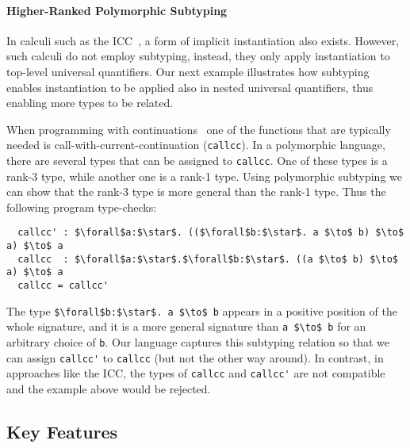 \paragraph{Higher-Ranked Polymorphic Subtyping}
\label{sec:higher-ranked-poly}

In calculi such as the ICC~\citep{miquel2001implicit}, a form of implicit instantiation also exists.
However, such calculi do not employ subtyping, instead, they only apply instantiation
to top-level universal quantifiers. Our next example illustrates how subtyping enables
instantiation to be applied also in nested universal quantifiers, thus enabling
more types to be related.

When programming with continuations~\citep{sussman1998scheme} one of the
functions that are typically needed is call-with-current-continuation
(\verb|callcc|). In a polymorphic language, there are several types that can be
assigned to \verb|callcc|. One of these types is a rank-3 type,
while another one is a rank-1 type.
Using polymorphic subtyping we can show that the rank-3
type is more general than the rank-1 type. Thus the following program type-checks:
\begin{lstlisting}
  callcc' : $\forall$a:$\star$. (($\forall$b:$\star$. a $\to$ b) $\to$ a) $\to$ a
  callcc  : $\forall$a:$\star$.$\forall$b:$\star$. ((a $\to$ b) $\to$ a) $\to$ a
  callcc = callcc'
\end{lstlisting}
\noindent The type \lstinline{$\forall$b:$\star$. a $\to$ b} appears in a positive position
of the whole signature, and it is a more general signature than \lstinline{a $\to$ b}
for an arbitrary choice of \lstinline{b}. Our language captures this subtyping relation so that
we can assign \lstinline{callcc'} to \lstinline{callcc} (but not the other way around).
In contrast, in approaches like the ICC, the types of \lstinline{callcc} and \lstinline{callcc'}
are not compatible and the example above would be rejected.

\subsection{Key Features}
\label{sec:feature-overview}

